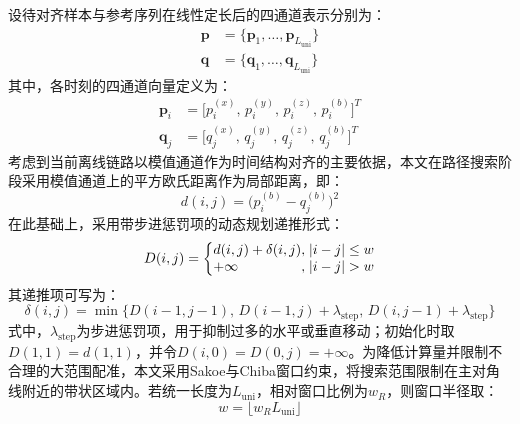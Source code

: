\documentclass{xdupgthesis}
\begin{document}
设待对齐样本与参考序列在线性定长后的四通道表示分别为：
\begin{equation}
    \begin{aligned}
        \mathbf{p}&=\{\mathbf{p}_1,\ldots,\mathbf{p}_{L_{\mathrm{uni}}}\}\\
        \mathbf{q}&=\{\mathbf{q}_1,\ldots,\mathbf{q}_{L_{\mathrm{uni}}}\}
    \end{aligned}
\end{equation}
其中，各时刻的四通道向量定义为：
\begin{equation}
    \begin{aligned}
        \mathbf{p}_i&=\big[p_i^{(x)},\,p_i^{(y)},\,p_i^{(z)},\,p_i^{(b)}\big]^T\\
        \mathbf{q}_j&=\big[q_j^{(x)},\,q_j^{(y)},\,q_j^{(z)},\,q_j^{(b)}\big]^T
    \end{aligned}
\end{equation}
考虑到当前离线链路以模值通道作为时间结构对齐的主要依据，本文在路径搜索阶段采用模值通道上的平方欧氏距离作为局部距离，即：
\begin{equation}
    d(i,j)=\big(p_i^{(b)}-q_j^{(b)}\big)^2
\end{equation}
在此基础上，采用带步进惩罚项的动态规划递推形式：
\begin{equation}
    D(i,j)=
    \left\{
    \begin{array}{@{}l@{,\;}l@{}}
        d(i,j)+\delta(i,j) & |i-j|\le w\\
        +\infty & |i-j|>w
    \end{array}
    \right.
\end{equation}
其递推项可写为：
\begin{equation}
    \delta(i,j)=\min\big\{D(i-1,j-1),\,D(i-1,j)+\lambda_{\mathrm{step}},\,D(i,j-1)+\lambda_{\mathrm{step}}\big\}
\end{equation}
式中，$\lambda_{\mathrm{step}}$为步进惩罚项，用于抑制过多的水平或垂直移动；初始化时取$D(1,1)=d(1,1)$，并令$D(i,0)=D(0,j)=+\infty$。为降低计算量并限制不合理的大范围配准，本文采用Sakoe与Chiba窗口约束，将搜索范围限制在主对角线附近的带状区域内。若统一长度为$L_{\mathrm{uni}}$，相对窗口比例为$w_R$，则窗口半径取：
\begin{equation}
    w=\lfloor w_R L_{\mathrm{uni}} \rfloor
\end{equation}
\end{document}
